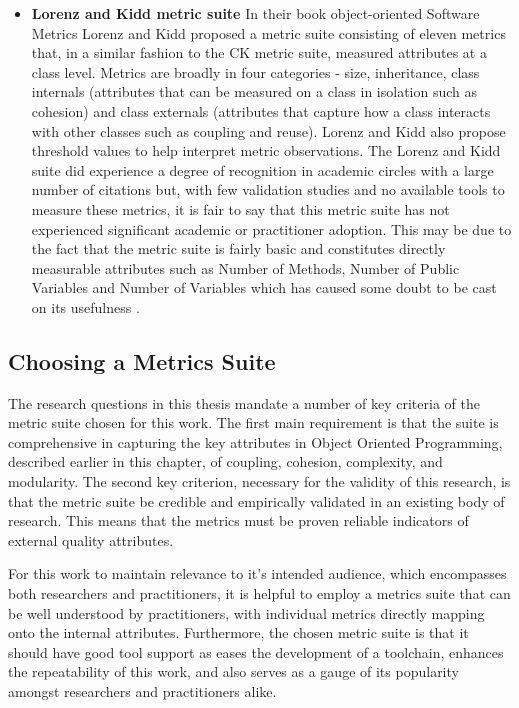 \begin{itemize}
\item \textbf{Lorenz and Kidd metric suite} In their book object-oriented Software Metrics \citep{lorenz1994object} Lorenz and Kidd proposed a metric suite consisting of eleven metrics that, in a similar fashion to the CK metric suite, measured attributes at a class level. Metrics are broadly in four categories - size, inheritance, class internals (attributes that can be measured on a class in isolation such as cohesion) and class externals (attributes that capture how a class interacts with other classes such as coupling and reuse). Lorenz and Kidd also propose threshold values to help interpret metric observations. The Lorenz and Kidd suite did experience a degree of recognition in academic circles with a large number of citations \citep{nesi1998effort} but, with few validation studies \citep{sharma2012metrics} and no available tools to measure these metrics, it is fair to say that this metric suite has not experienced significant academic or practitioner adoption. This may be due to the fact that the metric suite is fairly basic and constitutes directly measurable attributes such as Number of Methods, Number of Public Variables and Number of Variables which has caused some doubt to be cast on its usefulness \citep{harrison1998investigation}.
\end{itemize}

\subsection{Choosing a Metrics Suite} The research questions in this thesis mandate a number of key criteria of the metric suite chosen for this work. The first main requirement is that the suite is comprehensive in capturing the key attributes in Object Oriented Programming, described earlier in this chapter, of coupling, cohesion, complexity, and modularity. The second key criterion, necessary for the validity of this research, is that the metric suite be credible and empirically validated in an existing body of research. This means that the metrics must be proven reliable indicators of external quality attributes.

For this work to maintain relevance to it's intended audience, which encompasses both researchers and practitioners, it is helpful to employ a metrics suite that can be well understood by practitioners, with individual metrics directly mapping onto the internal attributes. Furthermore, the chosen metric suite is that it should have good tool support as eases the development of a toolchain, enhances the repeatability of this work, and also serves as a gauge of its popularity amongst researchers and practitioners alike. 

